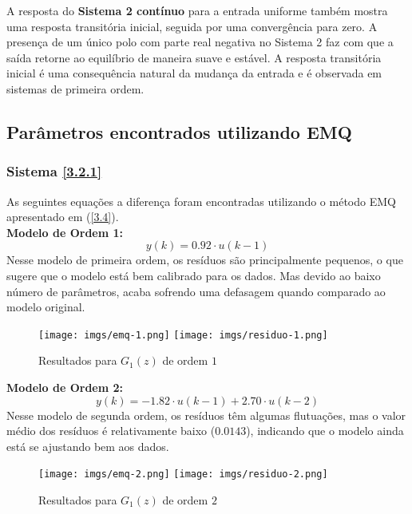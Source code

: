 \documentclass[a4paper,12pt]{article}
\begin{document}
A resposta do \textbf{Sistema 2 contínuo} para a entrada uniforme também mostra uma resposta transitória inicial, seguida por uma convergência para zero. A presença de um único polo com parte real negativa no Sistema 2 faz com que a saída retorne ao equilíbrio de maneira suave e estável. A resposta transitória inicial é uma consequência natural da mudança da entrada e é observada em sistemas de primeira ordem.

\subsection{Parâmetros encontrados utilizando EMQ}\label{4.4}

\subsubsection{Sistema \ref{3.2.1}}
As seguintes equações a diferença foram encontradas utilizando o método EMQ apresentado em (\ref{3.4}).\\

\noindent \textbf{Modelo de Ordem 1:}
\begin{equation*}
    y(k) = 0.92 \cdot u(k-1)\tag{4.4.1.1}
\end{equation*}
Nesse modelo de primeira ordem, os resíduos são principalmente pequenos, o que sugere que o modelo está bem calibrado para os dados. Mas devido ao baixo número de parâmetros, acaba sofrendo uma defasagem quando comparado ao modelo original.

\begin{figure}[h!]
\begin{center}
	\texttt{[image: imgs/emq-1.png]} \quad
	\texttt{[image: imgs/residuo-1.png]}
\caption{Resultados para $G_1(z)$ de ordem $1$} \label{fig6}
\end{center}
\end{figure}

\noindent \textbf{Modelo de Ordem 2:}
\begin{equation*}
    y(k) = -1.82 \cdot u(k-1) + 2.70 \cdot u(k-2)\tag{4.4.1.2}
\end{equation*}
Nesse modelo de segunda ordem, os resíduos têm algumas flutuações, mas o valor médio dos resíduos é relativamente baixo ($0.0143$), indicando que o modelo ainda está se ajustando bem aos dados.

\begin{figure}[h!]
\begin{center}
	\texttt{[image: imgs/emq-2.png]} \quad
	\texttt{[image: imgs/residuo-2.png]}
\caption{Resultados para $G_1(z)$ de ordem $2$} \label{fig7}
\end{center}
\end{figure}
\end{document}
